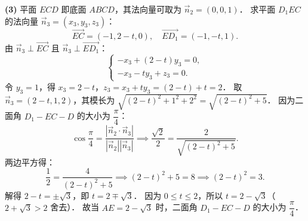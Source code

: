 \begin{answer}
\textbf{(3)}
平面 $ECD$ 即底面 $ABCD$，其法向量可取为 $\vec{n}_2 = (0, 0, 1)$．
求平面 $D_1EC$ 的法向量 $\vec{n}_3 = (x_3, y_3, z_3)$：
\nopagebreak[4]
\[
\vec{EC} = (-1, 2 - t, 0), \quad \vec{ED_1} = (-1, -t, 1).
\]
由 $\vec{n}_3 \perp \vec{EC}$ 且 $\vec{n}_3 \perp \vec{ED_1}$：
\nopagebreak[4]
\[
\begin{cases} -x_3 + (2 - t)y_3 = 0, \\ -x_3 - t y_3 + z_3 = 0. \end{cases}
\]
令 $y_3 = 1$，得 $x_3 = 2 - t$，$z_3 = x_3 + t y_3 = (2 - t) + t = 2$．
取 $\vec{n}_3 = (2 - t, 1, 2)$，其模长为 $\sqrt{(2 - t)^2 + 1^2 + 2^2} = \sqrt{(2 - t)^2 + 5}$．
因为二面角 $D_1 - EC - D$ 的大小为 $\dfrac{\pi}{4}$：
\nopagebreak[4]
\[
\cos\dfrac{\pi}{4} = \dfrac{|\vec{n}_2 \cdot \vec{n}_3|}{|\vec{n}_2||\vec{n}_3|} \implies \dfrac{\sqrt{2}}{2} = \dfrac{2}{\sqrt{(2 - t)^2 + 5}}.
\]
两边平方得：
\nopagebreak[4]
\[
\dfrac{1}{2} = \dfrac{4}{(2 - t)^2 + 5} \implies (2 - t)^2 + 5 = 8 \implies (2 - t)^2 = 3.
\]
解得 $2 - t = \pm\sqrt{3}$，即 $t = 2 \mp \sqrt{3}$．
因为 $0 \leqslant t \leqslant 2$，所以 $t = 2 - \sqrt{3}$（$2 + \sqrt{3} > 2$ 舍去）．
故当 $AE = 2 - \sqrt{3}$ 时，二面角 $D_1 - EC - D$ 的大小为 $\dfrac{\pi}{4}$．




\end{answer}
